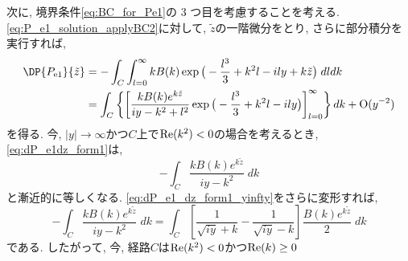 次に, 境界条件\eqref{eq:BC_for_Pe1}の 3 つ目を考慮することを考える. 
\eqref{eq:P_e1_solution_applyBC2}に対して, $\tilde{z}$の一階微分をとり, 
さらに部分積分を実行すれば, 
\begin{equation}
\begin{split}
  \DP{P_{\rm e1}}{\tilde{z}} &= 
                  - \int_C \int_{l=0}^\infty k B(k) 
                    \exp \big( -\dfrac{l^3}{3} + k^2 l - ily + k\tilde{z} \big) \; dl dk \\
  &= \int_C \left\{ \left[ 
              \dfrac{k B(k) e^{k\tilde{z}}}{iy - k^2 + l^2} \exp \big( -\dfrac{l^3}{3} + k^2l -ily \big)
             \right]_{l=0}^\infty \right\} dk + {\rm O}(y^{-2})
\end{split} 
\label{eq:dP_e1dz_form1}
\end{equation}
を得る. 
今, $|y| \to \infty$かつ$C$上で${\rm Re}(k^2) < 0$の場合を考えるとき, 
\eqref{eq:dP_e1dz_form1}は, 
\begin{equation}
  - \int_C \dfrac{k B(k) e^{k\tilde{z}}}{iy - k^2} \; dk
\label{eq:dP_e1_dz_form1_yinfty}
\end{equation}
と漸近的に等しくなる. 
\eqref{eq:dP_e1_dz_form1_yinfty}をさらに変形すれば, 
\begin{equation}
  - \int_C \dfrac{k B(k) e^{k\tilde{z}}}{iy - k^2} \; dk
 = \int_C \left[ \dfrac{1}{\sqrt{iy} + k} - \dfrac{1}{\sqrt{iy} - k}\right] \dfrac{B(k)e^{k\tilde{z}}}{2} \; dk  
\end{equation}
である. 
したがって, 
今, 経路$C$は${\rm Re}(k^2) < 0$かつ${\rm Re}(k) \geq 0$



